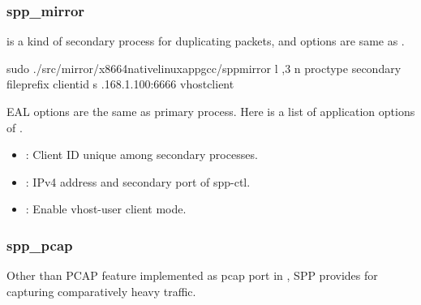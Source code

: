 \documentclass[a4paper,11pt,openany,oneside,english]{sphinxmanual}
\begin{document}
\subsubsection{spp\_mirror}
\label{\detokenize{gsg/howto_use:spp-mirror}}
 is a kind of secondary process for duplicating packets,
and options are same as .

\begin{sphinxVerbatim}[commandchars=\\\{\},formatcom=\footnotesize]
 sudo ./src/mirror/x86\PYGZus{}64\PYGZhy{}native\PYGZhy{}linuxapp\PYGZhy{}gcc/spp\PYGZus{}mirror 
    \PYGZhy{}l ,3 \PYGZhy{}n  
    \PYGZhy{}\PYGZhy{}proc\PYGZhy{}type secondary 
    \PYGZhy{}\PYGZhy{}file\PYGZhy{}prefix  
    \PYGZhy{}\PYGZhy{} 
    \PYGZhy{}\PYGZhy{}client\PYGZhy{}id  
    \PYGZhy{}s .168.1.100:6666 
    \PYGZhy{}\PYGZhy{}vhost\PYGZhy{}client
\end{sphinxVerbatim}

EAL options are the same as primary process. Here is a list of application
options of .
\begin{itemize}
\item {} 
: Client ID unique among secondary processes.

\item {} 
: IPv4 address and secondary port of spp-ctl.

\item {} 
: Enable vhost-user client mode.

\end{itemize}


\subsubsection{spp\_pcap}
\label{\detokenize{gsg/howto_use:spp-pcap}}\label{\detokenize{gsg/howto_use:spp-vf-gsg-howto-use-spp-pcap}}
Other than PCAP feature implemented as pcap port in ,
SPP provides  for capturing comparatively heavy traffic.
\end{document}
